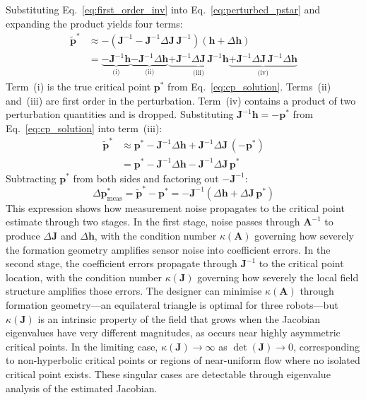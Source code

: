 \documentclass[lettersize,journal]{IEEEtran}
\begin{document}
Substituting Eq.~\eqref{eq:first_order_inv} into Eq.~\eqref{eq:perturbed_pstar} and expanding the product yields four terms:
\begin{align}
    \tilde{\mathbf{p}}^* &\approx -\left(\mathbf{J}^{-1} - \mathbf{J}^{-1}\Delta\mathbf{J}\,\mathbf{J}^{-1}\right)\!\left(\mathbf{h} + \Delta\mathbf{h}\right) \nonumber \\
    &= \underbrace{-\mathbf{J}^{-1}\mathbf{h}}_{\text{(i)}} \underbrace{- \mathbf{J}^{-1}\Delta\mathbf{h}}_{\text{(ii)}} \underbrace{+ \mathbf{J}^{-1}\Delta\mathbf{J}\,\mathbf{J}^{-1}\mathbf{h}}_{\text{(iii)}} \underbrace{+ \mathbf{J}^{-1}\Delta\mathbf{J}\,\mathbf{J}^{-1}\Delta\mathbf{h}}_{\text{(iv)}}
    \label{eq:expand_full}
\end{align}
Term~(i) is the true critical point $\mathbf{p}^*$ from Eq.~\eqref{eq:cp_solution}. Terms~(ii) and~(iii) are first order in the perturbation. Term~(iv) contains a product of two perturbation quantities and is dropped. Substituting $\mathbf{J}^{-1}\mathbf{h} = -\mathbf{p}^*$ from Eq.~\eqref{eq:cp_solution} into term~(iii):
\begin{align}
    \tilde{\mathbf{p}}^* &\approx \mathbf{p}^* - \mathbf{J}^{-1}\Delta\mathbf{h} + \mathbf{J}^{-1}\Delta\mathbf{J}\,(-\mathbf{p}^*) \nonumber \\
    &= \mathbf{p}^* - \mathbf{J}^{-1}\Delta\mathbf{h} - \mathbf{J}^{-1}\Delta\mathbf{J}\,\mathbf{p}^*
    \label{eq:regroup}
\end{align}
Subtracting $\mathbf{p}^*$ from both sides and factoring out $-\mathbf{J}^{-1}$:
\begin{equation}
    \Delta\mathbf{p}^*_{\text{meas}} = \tilde{\mathbf{p}}^* - \mathbf{p}^* = -\mathbf{J}^{-1}\!\left(\Delta\mathbf{h} + \Delta\mathbf{J}\,\mathbf{p}^*\right)
    \label{eq:dp_meas}
\end{equation}
This expression shows how measurement noise propagates to the critical point estimate through two stages. In the first stage, noise passes through $\mathbf{A}^{-1}$ to produce $\Delta\mathbf{J}$ and $\Delta\mathbf{h}$, with the condition number $\kappa(\mathbf{A})$ governing how severely the formation geometry amplifies sensor noise into coefficient errors. In the second stage, the coefficient errors propagate through $\mathbf{J}^{-1}$ to the critical point location, with the condition number $\kappa(\mathbf{J})$ governing how severely the local field structure amplifies those errors. The designer can minimise $\kappa(\mathbf{A})$ through formation geometry---an equilateral triangle is optimal for three robots---but $\kappa(\mathbf{J})$ is an intrinsic property of the field that grows when the Jacobian eigenvalues have very different magnitudes, as occurs near highly asymmetric critical points. In the limiting case, $\kappa(\mathbf{J}) \to \infty$ as $\det(\mathbf{J}) \to 0$, corresponding to non-hyperbolic critical points or regions of near-uniform flow where no isolated critical point exists. These singular cases are detectable through eigenvalue analysis of the estimated Jacobian.
\end{document}
